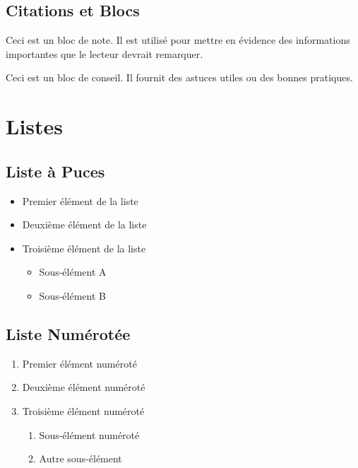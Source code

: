 \subsection{Citations et Blocs}

\begin{block}[note]
Ceci est un bloc de note. Il est utilisé pour mettre en évidence des informations importantes que le lecteur devrait remarquer.
\end{block}

\begin{block}[tip]
Ceci est un bloc de conseil. Il fournit des astuces utiles ou des bonnes pratiques.
\end{block}

\section{Listes}

\subsection{Liste à Puces}
\begin{itemize}
    \item Premier élément de la liste
    \item Deuxième élément de la liste
    \item Troisième élément de la liste
    \begin{itemize}
        \item Sous-élément A
        \item Sous-élément B
    \end{itemize}
\end{itemize}

\subsection{Liste Numérotée}
\begin{enumerate}
    \item Premier élément numéroté
    \item Deuxième élément numéroté
    \item Troisième élément numéroté
    \begin{enumerate}
        \item Sous-élément numéroté
        \item Autre sous-élément
    \end{enumerate}
\end{enumerate}

